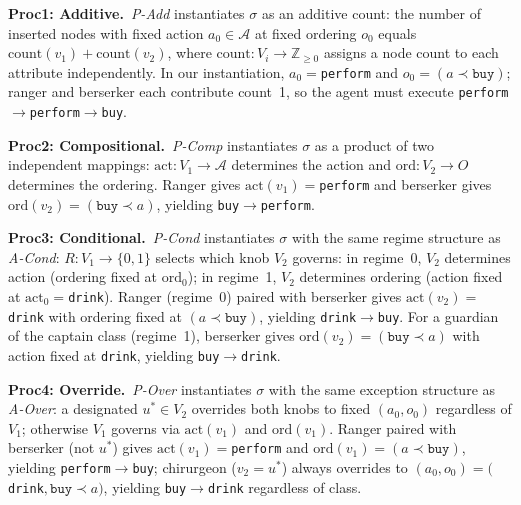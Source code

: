 \documentclass[11pt]{article}
\begin{document}

\noindent\textbf{Proc1: Additive.}~\textit{P-Add} instantiates $\sigma$ as an additive count: the number of inserted nodes with fixed action $a_0\in\mathcal{A}$ at fixed ordering $o_0$ equals $\text{count}(v_1){+}\text{count}(v_2)$, where $\text{count}{:}V_i{\to}\mathbb{Z}_{\geq 0}$ assigns a node count to each attribute independently. In our instantiation, $a_0{=}$\texttt{perform} and $o_0{=}(a{\prec}\texttt{buy})$; ranger and berserker each contribute count~1, so the agent must execute \texttt{perform}${\to}$\texttt{perform}${\to}$\texttt{buy}.

\noindent\textbf{Proc2: Compositional.}~\textit{P-Comp} instantiates $\sigma$ as a product of two independent mappings: $\text{act}{:}V_1{\to}\mathcal{A}$ determines the action and $\text{ord}{:}V_2{\to}O$ determines the ordering. Ranger gives $\text{act}(v_1){=}$\texttt{perform} and berserker gives $\text{ord}(v_2){=}(\texttt{buy}{\prec}a)$, yielding \texttt{buy}${\to}$\texttt{perform}.

\noindent\textbf{Proc3: Conditional.}~\textit{P-Cond} instantiates $\sigma$ with the same regime structure as \textit{A-Cond}: $R{:}V_1{\to}\{0,1\}$ selects which knob $V_2$ governs: in regime~0, $V_2$ determines action (ordering fixed at $\text{ord}_0$); in regime~1, $V_2$ determines ordering (action fixed at $\text{act}_0{=}$\texttt{drink}). Ranger (regime~0) paired with berserker gives $\text{act}(v_2){=}$\texttt{drink} with ordering fixed at $(a{\prec}\texttt{buy})$, yielding \texttt{drink}${\to}$\texttt{buy}. For a guardian of the captain class (regime~1), berserker gives $\text{ord}(v_2){=}(\texttt{buy}{\prec}a)$ with action fixed at \texttt{drink}, yielding \texttt{buy}${\to}$\texttt{drink}.

\noindent\textbf{Proc4: Override.}~\textit{P-Over} instantiates $\sigma$ with the same exception structure as \textit{A-Over}: a designated $u^*{\in}V_2$ overrides both knobs to fixed $(a_0,o_0)$ regardless of $V_1$; otherwise $V_1$ governs via $\text{act}(v_1)$ and $\text{ord}(v_1)$. Ranger paired with berserker (not $u^*$) gives $\text{act}(v_1){=}$\texttt{perform} and $\text{ord}(v_1){=}(a{\prec}\texttt{buy})$, yielding \texttt{perform}${\to}$\texttt{buy}; chirurgeon ($v_2{=}u^*$) always overrides to $(a_0,o_0){=}($\texttt{drink}$,\texttt{buy}{\prec}a)$, yielding \texttt{buy}${\to}$\texttt{drink} regardless of class.
\end{document}
